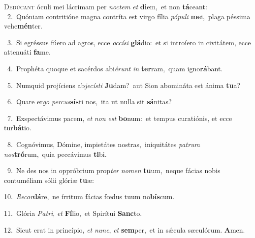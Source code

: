 \lettrine{\initial\textcolor{\initialcolor}{D}}{edúcant} óculi mei lácrimam per \textit{noc}\-\textit{tem} \textit{et} \textbf{di}\-em,~\star et non \textbf{tá}\-ceant:\\
{\numbfont\textcolor{\numbcolor}{~2.}}~Quóniam contritióne magna contríta est virgo fília \textit{pó}\-\textit{pu}\textit{li} \textbf{me}\-i,~\star plaga péssima vehe\-\textbf{mén}\-ter.\par
{\numbfont\textcolor{\numbcolor}{~3.}}~Si egréssus fúero ad agros, ecce \textit{oc}\-\textit{cí}\textit{si} \textbf{glá}\-dio:~\star et si introíero in civitátem, ecce attenuáti \textbf{fa}\-me.\par
{\numbfont\textcolor{\numbcolor}{~4.}}~Prophéta quoque et sacérdos abi\-\textit{é}\-\textit{runt} \textit{in} \textbf{ter}\-ram,~\star quam igno\-\textbf{rá}\-bant.\par
{\numbfont\textcolor{\numbcolor}{~5.}}~Numquid projíciens ab\-\textit{je}\-\textit{cís}\textit{ti} \textbf{Ju}\-dam?~\star aut Sion abomináta est ánima \textbf{tu}\-a?\par
{\numbfont\textcolor{\numbcolor}{~6.}}~Quare er\textit{go} \textit{per}\-\textit{cus}\textbf{sís}ti nos,~\star ita ut nulla sit \textbf{sá}\-nitas?\par
{\numbfont\textcolor{\numbcolor}{~7.}}~Exspectávimus pacem, \textit{et} \textit{non} \textit{est} \textbf{bo}\-num:~\star et tempus curatiónis, et ecce tur\-\textbf{bá}\-tio.\par
{\numbfont\textcolor{\numbcolor}{~8.}}~Cognóvimus, Dómine, impietátes nostras,~\dagger iniquitátes \textit{pa}\-\textit{trum} \textit{nos}\-\textbf{tró}rum,~\star quia peccávimus \textbf{ti}\-bi.\par
{\numbfont\textcolor{\numbcolor}{~9.}}~Ne des nos in oppróbrium prop\textit{ter} \textit{no}\-\textit{men} \textbf{tu}\-um,~\star neque fácias nobis contuméliam sólii glóriæ \textbf{tu}\-æ:\par
{\numbfont\textcolor{\numbcolor}{10.}}~\-\textit{Re}\-\textit{cor}\textbf{dá}re,~\star ne írritum fácias fœdus tuum no\-\textbf{bís}\-cum.\par
{\numbfont\textcolor{\numbcolor}{11.}}~Glória \textit{Pa}\-\textit{tri}, \textit{et} \textbf{Fí}\-lio,~\star et Spirítui \textbf{Sanc}\-to.\par
{\numbfont\textcolor{\numbcolor}{12.}}~Sicut erat in princípio, \textit{et} \textit{nunc}\-, \textit{et} \textbf{sem}\-per,~\star et in sǽcula sæculórum. \textbf{A}\-men.\par

